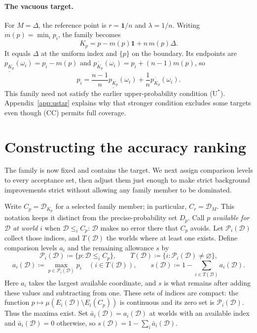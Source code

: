 \documentclass[11pt]{article}
\theoremstyle{remark}
\newcommand{\one}{\mathbf 1}
\newcommand{\Dscr}{\mathcal D}
\newcommand{\lowprob}[1]{\underline{p_{#1}}}
\newcommand{\upprob}[1]{\overline{p_{#1}}}
\begin{document}
\paragraph{The vacuous target.}
For $M=\Delta$, the reference point is $r=\one/n$ and $\lambda=1/n$. Writing
$m(p)=\min_i p_i$, the family becomes
\begin{equation}
 \boxed{\quad K_p=p-m(p)\one+n\,m(p)\Delta.\quad}\label{eq:vacuous}
\end{equation}
It equals $\Delta$ at the uniform index and $\{p\}$ on the boundary. Its
endpoints are $\lowprob{K_p}(\omega_i)=p_i-m(p)$ and
$\upprob{K_p}(\omega_i)=p_i+(n-1)m(p)$, so
\[
 p_i=\frac{n-1}{n}\lowprob{K_p}(\omega_i)+\frac1n\upprob{K_p}(\omega_i).
\]
This family need not satisfy the earlier upper-probability condition (U$^*$).
Appendix~\ref{app:ustar} explains why that stronger condition excludes some
targets even though (CC) permits full coverage.

\section{Constructing the accuracy ranking}

The family is now fixed and contains the target. We next assign comparison
levels to every acceptance set, then adjust them just enough to make strict
background improvements strict without allowing any family member to be dominated.

Write $C_p=\Dscr_{K_p}$ for a selected family member; in particular,
$C_r=\Dscr_M$. This notation keeps it distinct from the precise-probability
set $D_p$. Call $p$ \emph{available for $\Dscr$ at world $i$} when
$\Dscr\le_iC_p$: $\Dscr$ makes no error there that $C_p$ avoids. Let $\mathcal P_i(\Dscr)$ collect those indices, and $T(\Dscr)$ the worlds
where at least one exists. Define comparison levels $a_i$ and the remaining
allowance $s$ by
\[
 \mathcal P_i(\Dscr)\coloneqq\{p:\Dscr\le_iC_{p}\},\qquad
 T(\Dscr)\coloneqq\{i:\mathcal P_i(\Dscr)\ne\varnothing\},
\]
\[
 a_i(\Dscr)\coloneqq\max_{p\in\mathcal P_i(\Dscr)}p_i\quad(i\in T(\Dscr)),\qquad
 s(\Dscr)\coloneqq1-\sum_{i\in T(\Dscr)}a_i(\Dscr).
\]
Here $a_i$ takes the largest available coordinate, and $s$ is what remains
after adding these values and subtracting from one.
These sets of indices are compact: the function
$p\mapsto\mu(E_i(\Dscr)\setminus E_i(C_{p}))$ is continuous and its zero set is
$\mathcal P_i(\Dscr)$. Thus the maxima exist. Set $\bar a_i(\Dscr)=a_i(\Dscr)$ at worlds with an available index and $\bar a_i(\Dscr)=0$ otherwise, so $s(\Dscr)=1-\sum_i\bar a_i(\Dscr)$.
\end{document}
